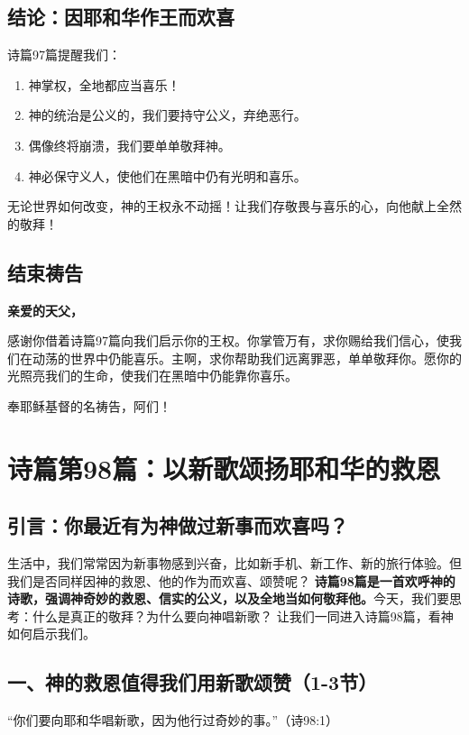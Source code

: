 \documentclass[a4paper, 12pt]{article}
\begin{document}
\subsection*{结论：因耶和华作王而欢喜}
诗篇97篇提醒我们：
\begin{enumerate}
    \item 神掌权，全地都应当喜乐！
    \item 神的统治是公义的，我们要持守公义，弃绝恶行。

    \item 偶像终将崩溃，我们要单单敬拜神。

    \item 神必保守义人，使他们在黑暗中仍有光明和喜乐。

\end{enumerate}


无论世界如何改变，神的王权永不动摇！让我们存敬畏与喜乐的心，向他献上全然的敬拜！

\subsection*{结束祷告}
\textbf{亲爱的天父，}

感谢你借着诗篇97篇向我们启示你的王权。你掌管万有，求你赐给我们信心，使我们在动荡的世界中仍能喜乐。主啊，求你帮助我们远离罪恶，单单敬拜你。愿你的光照亮我们的生命，使我们在黑暗中仍能靠你喜乐。

奉耶稣基督的名祷告，阿们！
\newpage
\section{诗篇第98篇：以新歌颂扬耶和华的救恩}
\subsection*{引言：你最近有为神做过新事而欢喜吗？}
生活中，我们常常因为新事物感到兴奋，比如新手机、新工作、新的旅行体验。但我们是否同样因神的救恩、他的作为而欢喜、颂赞呢？
\textbf{诗篇98篇是一首欢呼神的诗歌，强调神奇妙的救恩、信实的公义，以及全地当如何敬拜他。}今天，我们要思考：什么是真正的敬拜？为什么要向神唱新歌？
让我们一同进入诗篇98篇，看神如何启示我们。

\subsection*{一、神的救恩值得我们用新歌颂赞（1-3节）}
“你们要向耶和华唱新歌，因为他行过奇妙的事。”（诗98:1）
\end{document}
